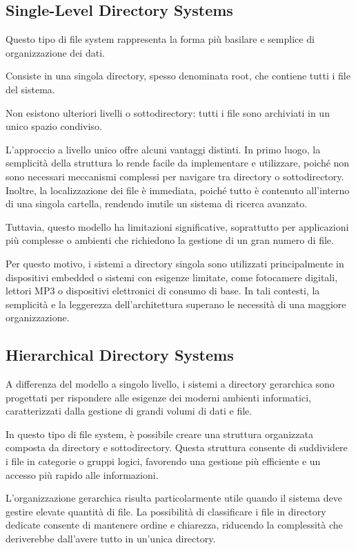 \documentclass[12pt,a4paper,openright,twoside]{book}
\begin{document}
        \subsection{Single-Level Directory Systems}
        Questo tipo di file system rappresenta la forma più basilare e semplice di organizzazione dei dati.

        Consiste in una singola directory, spesso denominata root, che contiene tutti i file del sistema.

        Non esistono ulteriori livelli o sottodirectory: tutti i file sono archiviati in un unico spazio condiviso.

        L'approccio a livello unico offre alcuni vantaggi distinti. In primo luogo, la semplicità della struttura lo rende facile da implementare e utilizzare, poiché non sono necessari meccanismi complessi per navigare tra directory o sottodirectory. Inoltre, la localizzazione dei file è immediata, poiché tutto è contenuto all'interno di una singola cartella, rendendo inutile un sistema di ricerca avanzato.

        Tuttavia, questo modello ha limitazioni significative, soprattutto per applicazioni più complesse o ambienti che richiedono la gestione di un gran numero di file.

        Per questo motivo, i sistemi a directory singola sono utilizzati principalmente in dispositivi embedded o sistemi con esigenze limitate, come fotocamere digitali, lettori MP3 o dispositivi elettronici di consumo di base. In tali contesti, la semplicità e la leggerezza dell'architettura superano le necessità di una maggiore organizzazione.

        \subsection{Hierarchical Directory Systems}
        A differenza del modello a singolo livello, i sistemi a directory gerarchica sono progettati per rispondere alle esigenze dei moderni ambienti informatici, caratterizzati dalla gestione di grandi volumi di dati e file.

        In questo tipo di file system, è possibile creare una struttura organizzata composta da directory e sottodirectory. Questa struttura consente di suddividere i file in categorie o gruppi logici, favorendo una gestione più efficiente e un accesso più rapido alle informazioni.

        L'organizzazione gerarchica risulta particolarmente utile quando il sistema deve gestire elevate quantità di file. La possibilità di classificare i file in directory dedicate consente di mantenere ordine e chiarezza, riducendo la complessità che deriverebbe dall'avere tutto in un'unica directory.
\end{document}
